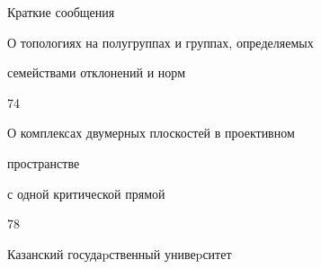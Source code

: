 \bigskip


{\centerline {Краткие сообщения}}


\bigskip







{О топологиях на полугруппах и группах, определяемых\newline


семействами отклонений и норм}{74}







{О комплексах двумерных плоскостей в проективном


пространстве\newline


с одной критической прямой}{78}











\vfill


\noindent\raisebox{2pt}{\copyright} Казанский госудаpственный унивеpситет





